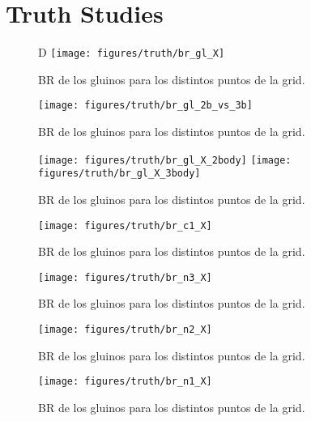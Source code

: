 \chapter{Truth Studies}



\begin{figure}[h]
D  \centering
  \texttt{[image: figures/truth/br\_gl\_X]}
  \caption{BR de los gluinos para los distintos puntos de la grid.}
\end{figure}

\begin{figure}[h]
  \centering
  \texttt{[image: figures/truth/br\_gl\_2b\_vs\_3b]}
  \caption{BR de los gluinos para los distintos puntos de la grid.}
\end{figure}

\begin{figure}[h]
  \texttt{[image: figures/truth/br\_gl\_X\_2body]}
  \texttt{[image: figures/truth/br\_gl\_X\_3body]}
 \caption{BR de los gluinos para los distintos puntos de la grid.}
\end{figure}


\begin{figure}[h]
  \centering
  \texttt{[image: figures/truth/br\_c1\_X]}
  \caption{BR de los gluinos para los distintos puntos de la grid.}
\end{figure}

\begin{figure}[h]
  \centering
  \texttt{[image: figures/truth/br\_n3\_X]}
  \caption{BR de los gluinos para los distintos puntos de la grid.}
\end{figure}

\begin{figure}[h]
  \centering
  \texttt{[image: figures/truth/br\_n2\_X]}
  \caption{BR de los gluinos para los distintos puntos de la grid.}
\end{figure}

\begin{figure}[h]
  \centering
  \texttt{[image: figures/truth/br\_n1\_X]}
  \caption{BR de los gluinos para los distintos puntos de la grid.}
\end{figure}

